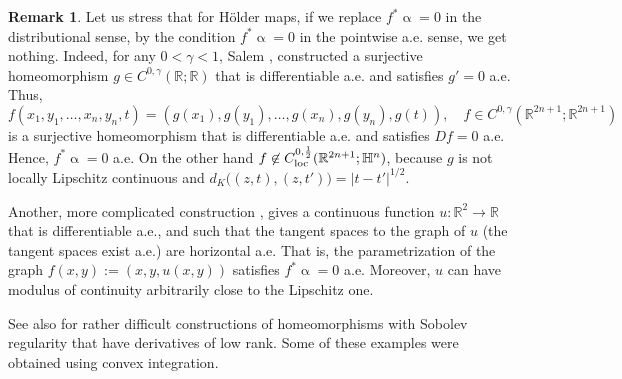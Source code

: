 \documentclass[intlimits,12pt,reqno]{amsart}
\newcommand{\bbbh}{\mathbb H}
\newcommand{\R}{\mathbb R}
\numberwithin{equation}{section}
\theoremstyle{definition}
\newtheorem{remark}[theorem]{Remark}
\begin{document}
\begin{remark}
Let us stress that for H\"older maps, if we replace $f^*\upalpha=0$ in the distributional sense, by the condition $f^*\upalpha=0$ in the pointwise a.e. sense, we get nothing. Indeed, for any $0<\gamma<1$, Salem \cite{salem}, constructed a surjective homeomorphism $g\in C^{0,\gamma}(\R;\R)$ that is differentiable a.e. and satisfies $g'=0$ a.e. Thus,
$$
f(x_1,y_1,\ldots,x_n,y_n,t)=(g(x_1),g(y_1),\ldots,g(x_n),g(y_n),g(t)),
\quad
f\in C^{0,\gamma}(\R^{2n+1};\R^{2n+1})
$$
is a surjective homeomorphism that is differentiable a.e. and satisfies $Df=0$ a.e. Hence, $f^*\upalpha=0$ a.e. On the other hand $f\not\in C^{0,\frac{1}{2}}_{\rm loc}(\R^{2n+1};\bbbh^n)$, because $g$ is not locally Lipschitz continuous and $d_K\big((z,t),(z,t')\big)=|t-t'|^{1/2}$. 

Another, more complicated construction \cite[Theorem~3.2]{HMR}, gives a continuous function $u:\R^2\to\R$ that is differentiable a.e., and such that the tangent spaces to the graph of $u$ (the tangent spaces exist a.e.) are horizontal a.e. That is, the parametrization of the graph $f(x,y):=(x,y,u(x,y))$ satisfies $f^*\upalpha=0$ a.e. Moreover, $u$ can have modulus of continuity arbitrarily close to the Lipschitz one.

See also \cite{CDLH,CHT,Cerny,FMCO18,Hencl,LiuM} for rather difficult constructions of homeomorphisms with Sobolev regularity that have derivatives of low rank. Some of these examples were obtained using convex integration.
\end{remark}
\end{document}
